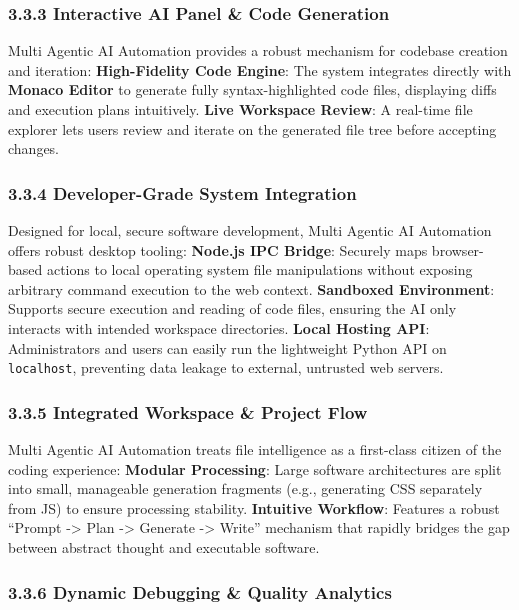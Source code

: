 \documentclass[
  12pt,
]{article}
\begin{document}
\subsubsection{3.3.3 Interactive AI Panel \& Code
Generation}\label{interactive-ai-panel-code-generation}

Multi Agentic AI Automation provides a robust mechanism for codebase
creation and iteration: \textbf{High-Fidelity Code Engine}: The system
integrates directly with \textbf{Monaco Editor} to generate fully
syntax-highlighted code files, displaying diffs and execution plans
intuitively. \textbf{Live Workspace Review}: A real-time file explorer
lets users review and iterate on the generated file tree before
accepting changes.

\subsubsection{3.3.4 Developer-Grade System
Integration}\label{developer-grade-system-integration}

Designed for local, secure software development, Multi Agentic AI
Automation offers robust desktop tooling: \textbf{Node.js IPC Bridge}:
Securely maps browser-based actions to local operating system file
manipulations without exposing arbitrary command execution to the web
context. \textbf{Sandboxed Environment}: Supports secure execution and
reading of code files, ensuring the AI only interacts with intended
workspace directories. \textbf{Local Hosting API}: Administrators and
users can easily run the lightweight Python API on \texttt{localhost},
preventing data leakage to external, untrusted web servers.

\subsubsection{3.3.5 Integrated Workspace \& Project
Flow}\label{integrated-workspace-project-flow}

Multi Agentic AI Automation treats file intelligence as a first-class
citizen of the coding experience: \textbf{Modular Processing}: Large
software architectures are split into small, manageable generation
fragments (e.g., generating CSS separately from JS) to ensure processing
stability. \textbf{Intuitive Workflow}: Features a robust ``Prompt
-\textgreater{} Plan -\textgreater{} Generate -\textgreater{} Write''
mechanism that rapidly bridges the gap between abstract thought and
executable software.

\subsubsection{3.3.6 Dynamic Debugging \& Quality
Analytics}\label{dynamic-debugging-quality-analytics}
\end{document}
